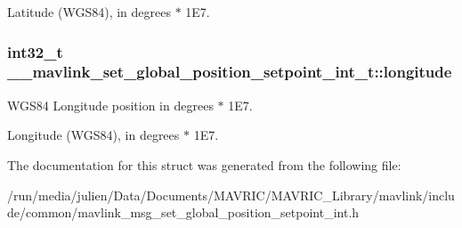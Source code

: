 Latitude (W\+G\+S84), in degrees $\ast$ 1\+E7. \hypertarget{struct____mavlink__set__global__position__setpoint__int__t_afe5579c39588820501f68c5114bf0902}{
\subsubsection[{longitude}]{\setlength{\rightskip}{0pt plus 5cm}int32\+\_\+t \+\_\+\+\_\+mavlink\+\_\+set\+\_\+global\+\_\+position\+\_\+setpoint\+\_\+int\+\_\+t\+::longitude}}\label{struct____mavlink__set__global__position__setpoint__int__t_afe5579c39588820501f68c5114bf0902}


W\+G\+S84 Longitude position in degrees $\ast$ 1\+E7. 

Longitude (W\+G\+S84), in degrees $\ast$ 1\+E7. 

The documentation for this struct was generated from the following file\+:\begin{DoxyCompactItemize}
\item 
/run/media/julien/\+Data/\+Documents/\+M\+A\+V\+R\+I\+C/\+M\+A\+V\+R\+I\+C\+\_\+\+Library/mavlink/include/common/mavlink\+\_\+msg\+\_\+set\+\_\+global\+\_\+position\+\_\+setpoint\+\_\+int.\+h\end{DoxyCompactItemize}

